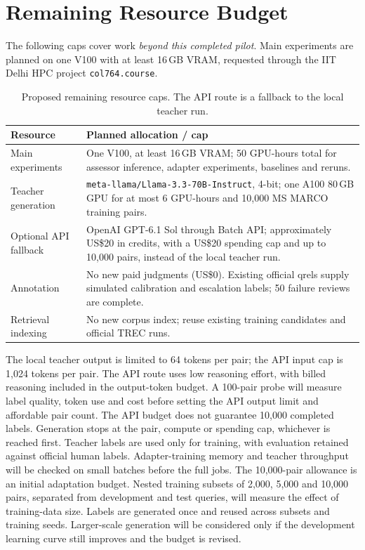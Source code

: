 \documentclass[11pt,a4paper]{article}
\begin{document}
\section{Remaining Resource Budget}
The following caps cover work \emph{beyond this completed pilot}. Main experiments
are planned on one V100 with at least 16\,GB VRAM, requested through the IIT Delhi
HPC project \texttt{col764.course}.

\begin{table}[H]\centering\small
\caption{Proposed remaining resource caps. The API route is a fallback to the local teacher run.}
\begin{tabularx}{\textwidth}{@{}P{3.5cm} Y@{}}\toprule
Resource & Planned allocation / cap \\\midrule
Main experiments & One V100, at least 16\,GB VRAM; 50 GPU-hours total for assessor inference, adapter experiments, baselines and reruns. \\[4pt]
Teacher generation & \texttt{meta-llama/Llama-3.3-70B-Instruct}, 4-bit; one A100 80\,GB GPU for at most 6 GPU-hours and 10,000 MS MARCO training pairs. \\[4pt]
Optional API fallback & OpenAI GPT-6.1 Sol through Batch API; approximately US\$20 in credits, with a US\$20 spending cap and up to 10,000 pairs, instead of the local teacher run. \\[4pt]
Annotation & No new paid judgments (US\$0). Existing official qrels supply simulated calibration and escalation labels; 50 failure reviews are complete. \\[4pt]
Retrieval indexing & No new corpus index; reuse existing training candidates and official TREC runs. \\
\bottomrule\end{tabularx}
\end{table}

The local teacher output is limited to 64 tokens per pair; the API input cap is
1,024 tokens per pair. The API route uses low reasoning effort, with billed reasoning
included in the output-token budget. A 100-pair probe will measure label quality,
token use and cost before setting the API output limit and affordable pair count.
The API budget does not guarantee 10,000 completed labels. Generation stops at the
pair, compute or spending cap, whichever is reached first. Teacher labels are used only for training, with
evaluation retained against official human labels. Adapter-training memory and
teacher throughput will be checked on small batches before the full jobs.
The 10,000-pair allowance is an initial adaptation budget. Nested training subsets
of 2,000, 5,000 and 10,000 pairs, separated from development and test queries, will
measure the effect of training-data size. Labels are generated once and reused
across subsets and training seeds. Larger-scale generation will be considered only
if the development learning curve still improves and the budget is revised.
\end{document}
